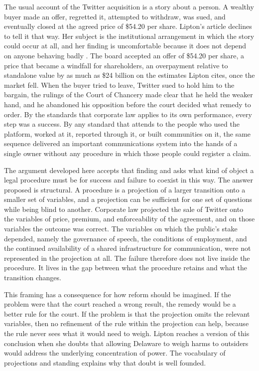 \documentclass[11pt]{article}
\theoremstyle{definition}
\begin{document}
The usual account of the Twitter acquisition is a story about a person. A wealthy buyer made an offer, regretted it, attempted to withdraw, was sued, and eventually closed at the agreed price of \$54.20 per share. Lipton's article declines to tell it that way. Her subject is the institutional arrangement in which the story could occur at all, and her finding is uncomfortable because it does not depend on anyone behaving badly \cite{lipton2024}. The board accepted an offer of \$54.20 per share, a price that became a windfall for shareholders, an overpayment relative to standalone value by as much as \$24 billion on the estimates Lipton cites, once the market fell. When the buyer tried to leave, Twitter sued to hold him to the bargain, the rulings of the Court of Chancery made clear that he held the weaker hand, and he abandoned his opposition before the court decided what remedy to order. By the standards that corporate law applies to its own performance, every step was a success. By any standard that attends to the people who used the platform, worked at it, reported through it, or built communities on it, the same sequence delivered an important communications system into the hands of a single owner without any procedure in which those people could register a claim.

The argument developed here accepts that finding and asks what kind of object a legal procedure must be for success and failure to coexist in this way. The answer proposed is structural. A procedure is a projection of a larger transition onto a smaller set of variables, and a projection can be sufficient for one set of questions while being blind to another. Corporate law projected the sale of Twitter onto the variables of price, premium, and enforceability of the agreement, and on those variables the outcome was correct. The variables on which the public's stake depended, namely the governance of speech, the conditions of employment, and the continued availability of a shared infrastructure for communication, were not represented in the projection at all. The failure therefore does not live inside the procedure. It lives in the gap between what the procedure retains and what the transition changes.

This framing has a consequence for how reform should be imagined. If the problem were that the court reached a wrong result, the remedy would be a better rule for the court. If the problem is that the projection omits the relevant variables, then no refinement of the rule within the projection can help, because the rule never sees what it would need to weigh. Lipton reaches a version of this conclusion when she doubts that allowing Delaware to weigh harms to outsiders would address the underlying concentration of power. The vocabulary of projections and standing explains why that doubt is well founded.
\end{document}
